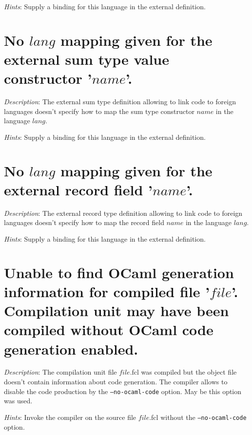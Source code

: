 {\em Hints}: Supply a binding for this language in the external
definition.



\section*{No $lang$ mapping given for the external sum type value
  constructor '$name$'.}

{\em Description}: The external sum type definition allowing to link
{\focal} code to foreign languages doesn't specify how to map the sum
type constructor $name$ in the language $lang$.

{\em Hints}: Supply a binding for this language in the external
definition.



\section*{No $lang$ mapping given for the external record field
  '$name$'.}

{\em Description}: The external record type definition allowing to
link {\focal} code to foreign languages doesn't specify how to map the
record field $name$ in the language $lang$.

{\em Hints}: Supply a binding for this language in the external
definition.



\section*{Unable to find OCaml generation information for compiled
  file '$file$'. Compilation unit may have been compiled without OCaml code
  generation enabled.}

{\em Description}: The {\focal} compilation unit file $file$.fcl was compiled but
the object file doesn't contain information about {\ocaml} code
generation. The {\focal} compiler allows to disable the {\ocaml} code
production by the {\tt --no-ocaml-code} option. May be this option was used.

{\em Hints}: Invoke the compiler on the source file $file$.fcl without
the {\tt --no-ocaml-code} option.



